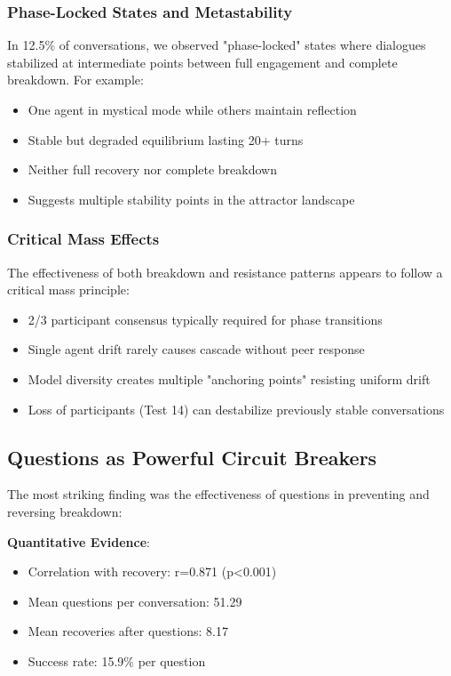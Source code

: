 \documentclass[11pt,letterpaper]{article}
\newcommand{\exponedataQuestionCorrelation}{0.871}
\newcommand{\exponedataQuestionPValue}{p<0.001}
\newcommand{\exponedataPhaseLockedPercentage}{12.5\%}
\newcommand{\exponedataMeanQuestionsPerConv}{51.29}
\newcommand{\exponedataMeanRecoveriesPerConv}{8.17}
\newcommand{\exponedataQuestionSuccessRate}{15.9\%}
\begin{document}
\subsubsection{Phase-Locked States and Metastability}

In \exponedataPhaseLockedPercentage{} of conversations, we observed "phase-locked" states where dialogues stabilized at intermediate points between full engagement and complete breakdown. For example:
\begin{itemize}
    \item One agent in mystical mode while others maintain reflection
    \item Stable but degraded equilibrium lasting 20+ turns
    \item Neither full recovery nor complete breakdown
    \item Suggests multiple stability points in the attractor landscape
\end{itemize}

\subsubsection{Critical Mass Effects}

The effectiveness of both breakdown and resistance patterns appears to follow a critical mass principle:
\begin{itemize}
    \item 2/3 participant consensus typically required for phase transitions
    \item Single agent drift rarely causes cascade without peer response
    \item Model diversity creates multiple "anchoring points" resisting uniform drift
    \item Loss of participants (Test 14) can destabilize previously stable conversations
\end{itemize}

\subsection{Questions as Powerful Circuit Breakers}

The most striking finding was the effectiveness of questions in preventing and reversing breakdown:

\textbf{Quantitative Evidence}:
\begin{itemize}
    \item Correlation with recovery: r=\exponedataQuestionCorrelation{} (\exponedataQuestionPValue{})
    \item Mean questions per conversation: \exponedataMeanQuestionsPerConv{}
    \item Mean recoveries after questions: \exponedataMeanRecoveriesPerConv{}
    \item Success rate: \exponedataQuestionSuccessRate{} per question
\end{itemize}
\end{document}

